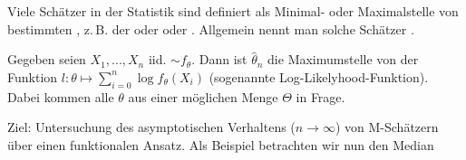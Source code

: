 Viele Schätzer in der Statistik sind definiert als Minimal- oder Maximalstelle von bestimmten , z.\,B. der  oder  oder . Allgemein nennt man solche Schätzer .

\begin{beispiel}
	Gegeben seien $X_1, ..., X_n$ iid. $\sim f_\theta$. Dann ist $\hat{\theta}_n$ die Maximumstelle von der Funktion $l \colon \theta \mapsto \sum_{i = 0}^n \log f_{\theta}(X_i)$ (sogenannte Log-Likelyhood-Funktion). Dabei kommen alle $\theta$ aus einer möglichen Menge $\Theta$ in Frage.
\end{beispiel}

Ziel: Untersuchung des asymptotischen Verhaltens ($n \to \infty$) von M-Schätzern über einen funktionalen Ansatz. Als Beispiel betrachten wir nun den Median
